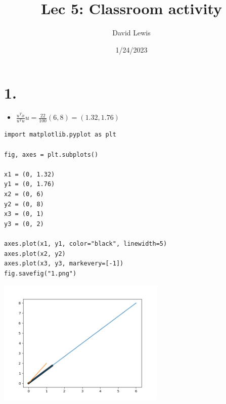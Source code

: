 \documentclass[11pt]{article}
\author{David Lewis}
\date{1/24/2023}
\title{Lec 5: Classroom activity}
\begin{document}
\maketitle
\section*{1.}
\label{sec:orgc7abf34}
\begin{itemize}
\item \(\frac{u^Tx}{u^Tu}u = \frac{22}{100}(6, 8) = (1.32, 1.76)\)
\end{itemize}

\begin{verbatim}
import matplotlib.pyplot as plt

fig, axes = plt.subplots()

x1 = (0, 1.32)
y1 = (0, 1.76)
x2 = (0, 6)
y2 = (0, 8)
x3 = (0, 1)
y3 = (0, 2)

axes.plot(x1, y1, color="black", linewidth=5)
axes.plot(x2, y2)
axes.plot(x3, y3, markevery=[-1])
fig.savefig("1.png")
\end{verbatim}

\begin{center}
\includegraphics[width=8cm]{1.png}
\end{center}
\end{document}
